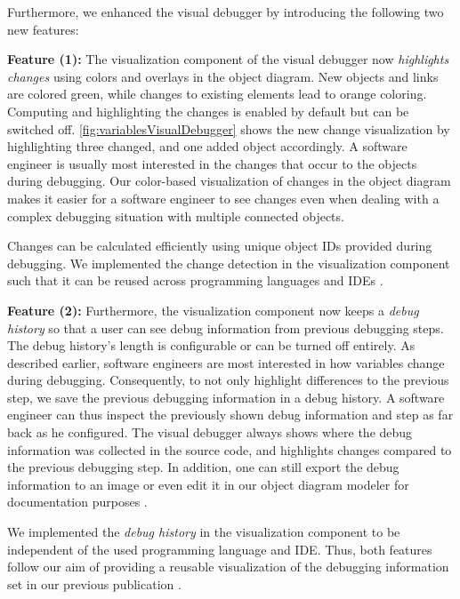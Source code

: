 \documentclass[sigconf]{acmart}
\begin{document}
Furthermore, we enhanced the visual debugger by introducing the following two new features:

\textbf{Feature (1):} The visualization component of the visual debugger now \textit{highlights changes} using colors and overlays in the object diagram.
New objects and links are colored green, while changes to existing elements lead to orange coloring.
Computing and highlighting the changes is enabled by default but can be switched off.
\autoref{fig:variablesVisualDebugger} shows the new change visualization by highlighting three changed, and one added object accordingly.
A software engineer is usually most interested in the changes that occur to the objects during debugging.
Our color-based visualization of changes in the object diagram makes it easier for a software engineer to see changes even when dealing with a complex debugging situation with multiple connected objects.

Changes can be calculated efficiently using unique object IDs provided during debugging.
We implemented the change detection in the visualization component such that it can be reused across programming languages and IDEs \cite{timkrauterICSE2024Artifacts2023}.

\textbf{Feature (2):} Furthermore, the visualization component now keeps a \textit{debug history} so that a user can see debug information from previous debugging steps.
The debug history's length is configurable or can be turned off entirely.
As described earlier, software engineers are most interested in how variables change during debugging.
Consequently, to not only highlight differences to the previous step, we save the previous debugging information in a debug history.
A software engineer can thus inspect the previously shown debug information and step as far back as he configured.
The visual debugger always shows where the debug information was collected in the source code, and highlights changes compared to the previous debugging step.
In addition, one can still export the debug information to an image or even edit it in our object diagram modeler \cite{timkrauterObjectdiagramjs2023} for documentation purposes \cite{krauterVisualDebuggerTool2022}.

We implemented the \textit{debug history} in the visualization component to be independent of the used programming language and IDE.
Thus, both features follow our aim of providing a reusable visualization of the debugging information set in our previous publication \cite{krauterVisualDebuggerTool2022}.
\end{document}
